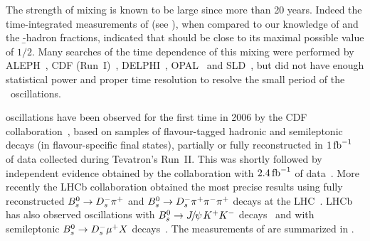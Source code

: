  

 


The strength of \Bs mixing is known to be large since more than 20 years. 
Indeed the time-integrated measurements of \chibar (see ),
when compared to our knowledge
of \chid and the \b-hadron fractions, indicated that 
\chis should be close to its maximal possible value of $1/2$.
Many searches of the time dependence of this mixing 
were performed by ALEPH~\cite{Heister:2002gk},
CDF (Run~I)~\cite{Abe:1998qj},
DELPHI~\cite{Abreu:2000sh,Abreu:2000ev,Abdallah:2002mr,Abdallah:2003we},
OPAL~\cite{Abbiendi:1999gm,Abbiendi:2000bh} and
SLD~\cite{Abe:2002ua,Abe:2002wfa,Abe:2000gp},
but did not have enough statistical power
and proper time resolution to resolve 
the small period of the \Bs\ oscillations.

\Bs oscillations have been observed for the first time in 2006
by the CDF collaboration~\cite{Abulencia:2006ze,*Abulencia:2006mq_mod_cont},
based on samples of flavour-tagged hadronic and semileptonic \Bs decays
(in flavour-specific final states), partially or fully reconstructed in 
$1\mbox{\,fb}^{-1}$ of data collected during Tevatron's Run~II. 
This was shortly followed by independent evidence obtained by the \dzero collaboration
with $2.4\mbox{\,fb}^{-1}$ of
data~\cite{D0note5618:2008,*D0note5474:2007,*D0note5254:2006,*Abazov:2006dm_mod_cont}.
More recently the LHCb collaboration obtained the most precise results using fully reconstructed 
$B^0_s \to D_s^-\pi^+$ and $B^0_s \to D_s^-\pi^+\pi^-\pi^+$ decays at the 
LHC~\cite{Aaij:2011qx,Aaij:2013mpa}.
LHCb has also observed \Bs oscillations with 
$B^0_s\to{J\mskip -3mu/\mskip -2mu\psi\mskip 2mu} K^+K^-$ decays~\cite{LHCB-PAPER-2014-059,*Aaij:2013oba_supersede2}
and with semileptonic $B^0_s \to D_s^-\mu^+ X$ decays~\cite{Aaij:2013gja}.
The measurements of \dms are summarized in . 

